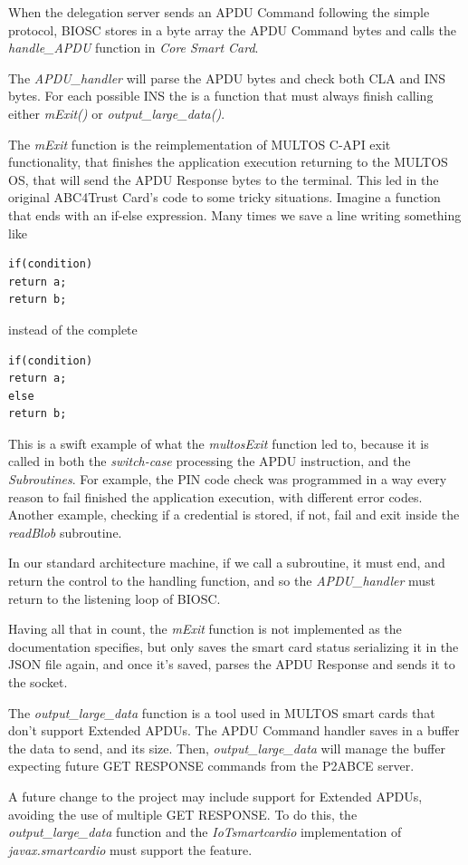 When the delegation server sends an APDU Command following the simple protocol, BIOSC stores in a byte array the APDU Command bytes and calls the \textit{handle\_APDU} function in \textit{Core Smart Card}.


The \textit{APDU\_handler} will parse the APDU bytes and check both CLA and INS bytes. For each possible INS the is a function that must always finish calling either \textit{mExit()} or \textit{output\_large\_data()}.

The \textit{mExit} function is the reimplementation of MULTOS C-API exit functionality, that finishes the application execution returning to the MULTOS OS, that will send the APDU Response bytes to the terminal. This led in the original ABC4Trust Card's code to some tricky situations. Imagine a function that ends with an if-else expression. Many times we save a line writing something like

\begin{verbatim}
if(condition)
return a;
return b;
\end{verbatim}

instead of the complete

\begin{verbatim}
if(condition)
return a;
else
return b;
\end{verbatim}

This is a swift example of what the \textit{multosExit} function led to, because it is called in both the \textit{switch-case} processing the APDU instruction, and the \textit{Subroutines}. For example, the PIN code check was programmed in a way every reason to fail finished the application execution, with different error codes. Another example, checking if a credential is stored, if not, fail and exit inside the \textit{readBlob} subroutine.

In our standard architecture machine, if we call a subroutine, it must end, and return the control to the handling function, and so the \textit{APDU\_handler} must return to the listening loop of BIOSC.

Having all that in count, the \textit{mExit} function is not implemented as the documentation specifies, but only saves the smart card status serializing it in the JSON file again, and once it's saved, parses the APDU Response and sends it to the socket.

The \textit{output\_large\_data} function is a tool used in MULTOS smart cards that don't support Extended APDUs. The APDU Command handler saves in a buffer the data to send, and its size. Then, \textit{output\_large\_data} will manage the buffer expecting future GET RESPONSE commands from the P2ABCE server.

A future change to the project may include support for Extended APDUs, avoiding the use of multiple GET RESPONSE. To do this, the \textit{output\_large\_data} function and the \textit{IoTsmartcardio} implementation of \textit{javax.smartcardio} must support the feature.






